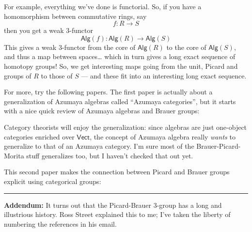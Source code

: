 \documentclass{article}
\def\tightlist{}
\renewcommand{\texttt}[1]{%
  \begingroup
  \ttfamily
  \begingroup\lccode`~=`/\lowercase{\endgroup\def~}{/\discretionary{}{}{}}%
  \begingroup\lccode`~=`[\lowercase{\endgroup\def~}{[\discretionary{}{}{}}%
  \begingroup\lccode`~=`.\lowercase{\endgroup\def~}{.\discretionary{}{}{}}%
  \catcode`/=\active\catcode`[=\active\catcode`.=\active
  \scantokens{#1\noexpand}%
  \endgroup
}
\begin{document}
For example, everything we've done is functorial. So, if you have a
homomorphism between commutative rings, say \[f\colon R \to S\] then you
get a weak 3-functor
\[\mathsf{Alg}(f)\colon \mathsf{Alg}(R) \to \mathsf{Alg}(S)\] This gives
a weak 3-functor from the core of \(\mathsf{Alg}(R)\) to the core of
\(\mathsf{Alg}(S)\), and thus a map between spaces\ldots{} which in turn
gives a long exact sequence of homotopy groups! So, we get interesting
maps going from the unit, Picard and groups of \(R\) to those of \(S\)
--- and these fit into an interesting long exact sequence.

For more, try the following papers. The first paper is actually about a
generalization of Azumaya algebras called ``Azumaya categories'', but it
starts with a nice quick review of Azumaya algebras and Brauer groups:


Category theorists will enjoy the generalization: since algebras are
just one-object categories enriched over \(\mathsf{Vect}\), the concept
of Azumaya algebra really \emph{wants} to generalize to that of an
Azumaya category. I'm sure most of the Brauer-Picard-Morita stuff
generalizes too, but I haven't checked that out yet.

This second paper makes the connection between Picard and Brauer groups
explicit using categorical groups:


\begin{center}\rule{0.5\linewidth}{0.5pt}\end{center}

\textbf{Addendum:} It turns out that the Picard-Brauer \(3\)-group has a
long and illustrious history. Ross Street explained this to me; I've
taken the liberty of numbering the references in his email.
\end{document}
